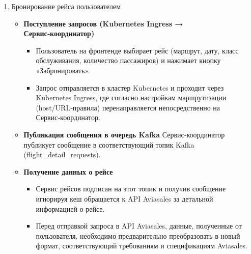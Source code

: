 \begin{enumerate}
\begin{itemize}
        \item \textbf{Возврат данных на фронтенд}
        \begin{itemize}
            \item Фронтенд получает JSON-ответ, в котором содержится подробная информация по каждому найденному рейсу. 
            \item На основе этой структуры JSON клиентская часть формирует динамический контент: пользователь видит список доступных перелётов, их стоимость, время вылета и прочие детали, отфильтрованные согласно исходным параметрам.
        \end{itemize}

    \end{itemize}

    \item Бронирование рейса пользователем
    \begin{itemize}

        \item \textbf{Поступление запросов (Kubernetes Ingress → Сервис‑координатор)}
        \begin{itemize}
            \item Пользователь на фронтенде выбирает рейс (маршрут, дату, класс обслуживания, количество пассажиров) и нажимает кнопку «Забронировать».
            \item Запрос отправляется в кластер Kubernetes и проходит через Kubernetes Ingress, где согласно настройкам маршрутизации (host/URL‑правила) перенаправляется непосредственно на Сервис‑координатор.
        \end{itemize}

        \item \textbf{Публикация сообщения в очередь Kafka}
        Сервис‑координатор публикует сообщение в соответствующий топик Kafka (flight\_detail\_requests).

        \item \textbf{Получение данных о рейсе}
        \begin{itemize}
            \item Сервис рейсов подписан на этот топик и получив сообщение игнорируя кеш обращается к API Aviasales за детальной информацией о рейсе.
            \item Перед отправкой запроса в API Aviasales, данные, полученные от пользователя, необходимо предварительно преобразовать в новый формат, соответствующий требованиям и спецификациям Aviasales.
        \end{itemize}
        

\end{itemize}
\end{enumerate}
